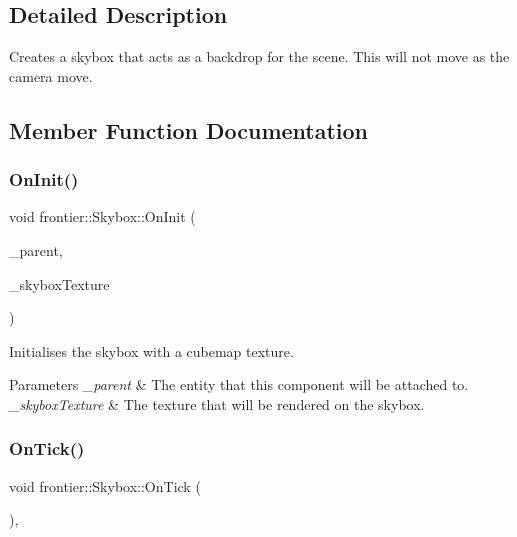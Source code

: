 \subsection{Detailed Description}
Creates a skybox that acts as a backdrop for the scene. This will not move as the camera move. 

\subsection{Member Function Documentation}
\mbox{\label{classfrontier_1_1_skybox_a02a06c87053a2efd6893c0b07465f3c2}} 
\subsubsection{\texorpdfstring{On\+Init()}{OnInit()}}
{\footnotesize\ttfamily void frontier\+::\+Skybox\+::\+On\+Init (\begin{DoxyParamCaption}\item[{std\+::weak\+\_\+ptr$<$ \hyperlink{classfrontier_1_1_entity}{Entity} $>$}]{\+\_\+parent,  }\item[{std\+::shared\+\_\+ptr$<$ \hyperlink{classfrontier_1_1_cubemap_texture}{Cubemap\+Texture} $>$}]{\+\_\+skybox\+Texture }\end{DoxyParamCaption})}



Initialises the skybox with a cubemap texture. 


\begin{DoxyParams}{Parameters}
{\em \+\_\+parent} & The entity that this component will be attached to. \\
\hline
{\em \+\_\+skybox\+Texture} & The texture that will be rendered on the skybox. \\
\hline
\end{DoxyParams}
\mbox{\label{classfrontier_1_1_skybox_a38b2ec1a28314c901f4388745d8f0471}} 
\subsubsection{\texorpdfstring{On\+Tick()}{OnTick()}}
{\footnotesize\ttfamily void frontier\+::\+Skybox\+::\+On\+Tick (\begin{DoxyParamCaption}{ }\end{DoxyParamCaption})\hspace{0.3cm}{\ttfamily [override]}, {\ttfamily [virtual]}}



